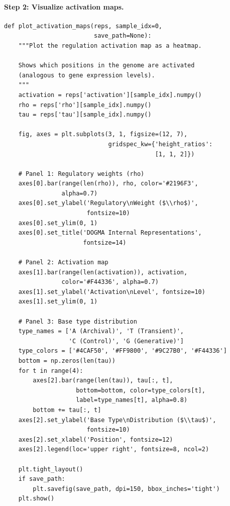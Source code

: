 \paragraph{Step 2: Visualize activation maps.}

\begin{lstlisting}[style=dogmapython, caption={Lab 8: Activation map visualization.}]
def plot_activation_maps(reps, sample_idx=0,
                         save_path=None):
    """Plot the regulation activation map as a heatmap.

    Shows which positions in the genome are activated
    (analogous to gene expression levels).
    """
    activation = reps['activation'][sample_idx].numpy()
    rho = reps['rho'][sample_idx].numpy()
    tau = reps['tau'][sample_idx].numpy()

    fig, axes = plt.subplots(3, 1, figsize=(12, 7),
                             gridspec_kw={'height_ratios':
                                          [1, 1, 2]})

    # Panel 1: Regulatory weights (rho)
    axes[0].bar(range(len(rho)), rho, color='#2196F3',
                alpha=0.7)
    axes[0].set_ylabel('Regulatory\nWeight ($\\rho$)',
                       fontsize=10)
    axes[0].set_ylim(0, 1)
    axes[0].set_title('DOGMA Internal Representations',
                      fontsize=14)

    # Panel 2: Activation map
    axes[1].bar(range(len(activation)), activation,
                color='#F44336', alpha=0.7)
    axes[1].set_ylabel('Activation\nLevel', fontsize=10)
    axes[1].set_ylim(0, 1)

    # Panel 3: Base type distribution
    type_names = ['A (Archival)', 'T (Transient)',
                  'C (Control)', 'G (Generative)']
    type_colors = ['#4CAF50', '#FF9800', '#9C27B0', '#F44336']
    bottom = np.zeros(len(tau))
    for t in range(4):
        axes[2].bar(range(len(tau)), tau[:, t],
                    bottom=bottom, color=type_colors[t],
                    label=type_names[t], alpha=0.8)
        bottom += tau[:, t]
    axes[2].set_ylabel('Base Type\nDistribution ($\\tau$)',
                       fontsize=10)
    axes[2].set_xlabel('Position', fontsize=12)
    axes[2].legend(loc='upper right', fontsize=8, ncol=2)

    plt.tight_layout()
    if save_path:
        plt.savefig(save_path, dpi=150, bbox_inches='tight')
    plt.show()
\end{lstlisting}

